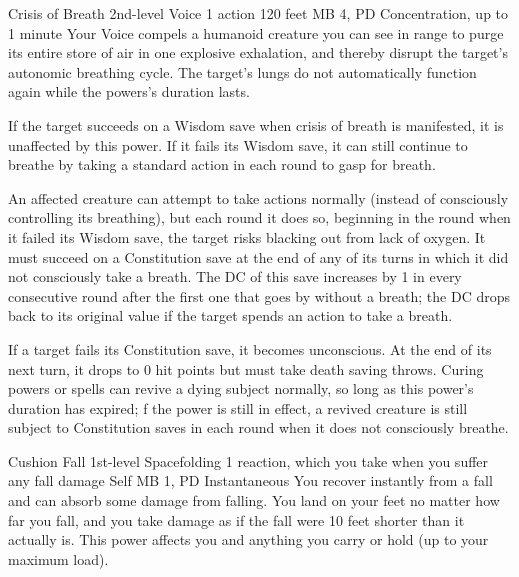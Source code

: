 \DndPowerHeader%
  {Crisis of Breath}
  {2nd-level Voice}
  {1 action}
  {120 feet}
  {MB 4, PD \lvlthree}
  {Concentration, up to 1 minute}
  Your Voice compels a humanoid creature you can see in range
  to purge its entire store of air
  in one explosive exhalation,
  and thereby disrupt the target's autonomic breathing cycle.
  The target's lungs do not automatically function
  again while the powers's duration lasts.

  If the target succeeds on a Wisdom save when
  crisis of breath is manifested,
  it is unaffected by this power.
  If it fails its Wisdom save,
  it can still continue to breathe by taking a standard action
  in each round to gasp for breath.
  
  An affected creature can attempt to take actions normally
  (instead of consciously controlling its breathing),
  but each round it does so,
  beginning in the round when it failed its Wisdom save,
  the target risks blacking out from lack of oxygen.
  It must succeed on a Constitution save
  at the end of any of its turns in which
  it did not consciously take a breath.
  The DC of this save increases by 1 in every consecutive
  round after the first one that goes by without a breath;
  the DC drops back to its original value
  if the target spends an action to take a breath.
  
  If a target fails its Constitution save,
  it becomes unconscious.
  At the end of its next turn,
  it drops to 0 hit points
  but must take death saving throws.
  Curing powers or spells can revive a dying subject normally,
  so long as this power's duration has expired; 
  f the power is still in effect,
  a revived creature is still subject to Constitution saves
  in each round when it does not consciously breathe.

\DndPowerHeader%
  {Cushion Fall}
  {1st-level Spacefolding}
  {1 reaction, which you take when you suffer any fall damage}
  {Self}
  {MB 1, PD \lvlone}
  {Instantaneous}
  You recover instantly from a fall
  and can absorb some damage from falling.
  You land on your feet no matter how far you fall,
  and you take damage as if the fall were
  10 feet shorter than it actually is.
  This power affects you and anything you carry or hold
  (up to your maximum load).

